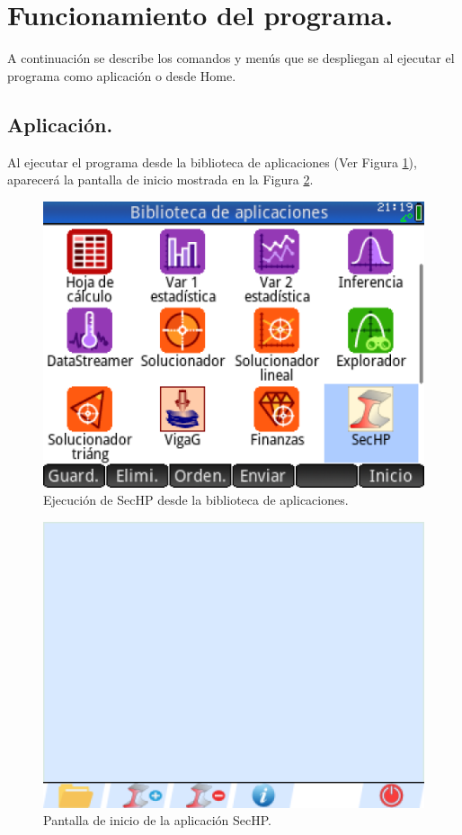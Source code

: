 \documentclass[spanish,xcolor=pdftex,dvipsnames,table,mathserif]{scrartcl}
\begin{document}
\section{Funcionamiento del programa.}
A continuación se describe los comandos y menús que se despliegan al ejecutar el programa como aplicación o desde Home.

\subsection{Aplicación.}
Al ejecutar el programa desde la biblioteca de aplicaciones (Ver Figura \ref{fig:ejeAppBibl}), aparecerá la pantalla de inicio mostrada en la Figura \ref{fig:inicio}. 
\begin{figure}[H]
	\centering
	\caption{Ejecución de SecHP desde la biblioteca de aplicaciones.}
	\label{fig:ejeAppBibl}
	\includegraphics[width=0.45\linewidth]{imagenes/app}	
\end{figure}
\begin{figure}[H]
	\centering
	\caption{Pantalla de inicio de la aplicación SecHP.}
	\label{fig:inicio}
	\includegraphics[width=0.45\linewidth]{imagenes/pantallaInicio}	
\end{figure}
\end{document}
